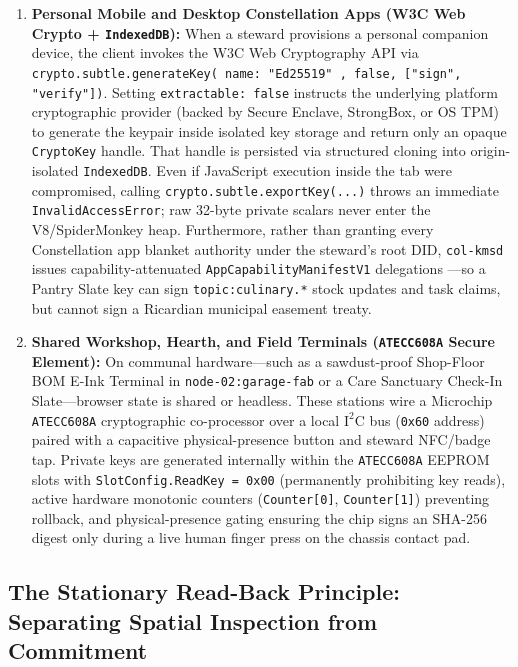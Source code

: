 \begin{enumerate}
  \item \textbf{Personal Mobile and Desktop Constellation Apps (W3C Web Crypto + \texttt{IndexedDB}):} When a steward provisions a personal companion device, the client invokes the W3C Web Cryptography API \parencite{w3c2017webcrypto} via \texttt{crypto.subtle.generateKey({ name: "Ed25519" }, false, ["sign", "verify"])}. Setting \texttt{extractable: false} instructs the underlying platform cryptographic provider (backed by Secure Enclave, StrongBox, or OS TPM) to generate the keypair inside isolated key storage and return only an opaque \texttt{CryptoKey} handle. That handle is persisted via structured cloning into origin-isolated \texttt{IndexedDB}. Even if JavaScript execution inside the tab were compromised, calling \texttt{crypto.subtle.exportKey(...)} throws an immediate \texttt{InvalidAccessError}; raw 32-byte private scalars never enter the V8/SpiderMonkey heap. Furthermore, rather than granting every Constellation app blanket authority under the steward's root DID, \texttt{col-kmsd} issues capability-attenuated \texttt{AppCapabilityManifestV1} delegations \parencite{miller2006robust,w3c2022vc}---so a Pantry Slate key can sign \texttt{topic:culinary.*} stock updates and task claims, but cannot sign a Ricardian municipal easement treaty.
  \item \textbf{Shared Workshop, Hearth, and Field Terminals (\texttt{ATECC608A} Secure Element):} On communal hardware---such as a sawdust-proof Shop-Floor BOM E-Ink Terminal in \texttt{node-02:garage-fab} or a Care Sanctuary Check-In Slate---browser state is shared or headless. These stations wire a Microchip \texttt{ATECC608A} cryptographic co-processor \parencite{microchip_atecc608a} over a local $\mathrm{I^2C}$ bus (\texttt{0x60} address) paired with a capacitive physical-presence button and steward NFC/badge tap. Private keys are generated internally within the \texttt{ATECC608A} EEPROM slots with \texttt{SlotConfig.ReadKey = 0x00} (permanently prohibiting key reads), active hardware monotonic counters (\texttt{Counter[0]}, \texttt{Counter[1]}) preventing rollback, and physical-presence gating ensuring the chip signs an SHA-256 digest only during a live human finger press on the chassis contact pad.
\end{enumerate}

\subsection{The Stationary Read-Back Principle: Separating Spatial Inspection from Commitment}
\label{subsec:anti-canvas}

